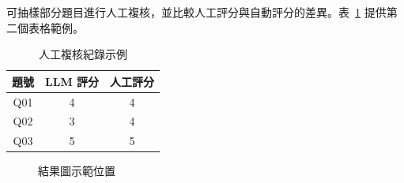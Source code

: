可抽樣部分題目進行人工複核，並比較人工評分與自動評分的差異。表~\ref{tab:agreement} 提供第二個表格範例。

\begin{table}[H]
  \caption{人工複核紀錄示例}
  \label{tab:agreement}
  \centering
  \begin{tabular}{ccc}
    \toprule
    題號 & LLM 評分 & 人工評分 \\
    \midrule
    Q01 & 4 & 4 \\
    Q02 & 3 & 4 \\
    Q03 & 5 & 5 \\
    \bottomrule
  \end{tabular}
\end{table}

\begin{figure}[H]
  \centering
  \fbox{\rule{0pt}{3.2cm}\rule{0.72\textwidth}{0pt}}
  \caption{結果圖示範位置}
  \label{fig:placeholder}
\end{figure}
